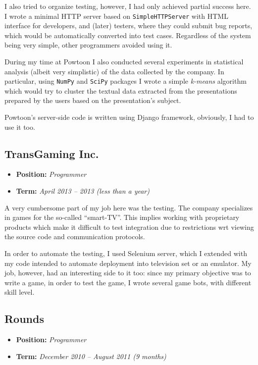 \documentclass[11pt]{article}
\begin{document}
I also tried to organize testing, however, I had only achieved partial success
here.  I wrote a minimal HTTP server based on \texttt{SimpleHTTPServer} with HTML
interface for developers, and (later) testers, where they could submit bug
reports, which would be automatically converted into test cases.  Regardless
of the system being very simple, other programmers avoided using it.

During my time at Powtoon I also conducted several experiments in statistical
analysis (albeit very simplistic) of the data collected by the company.
In particular, using \texttt{NumPy} and \texttt{SciPy} packages I wrote a simple \emph{k-means}
algorithm which would try to cluster the textual data extracted from the
presentations prepared by the users based on the presentation's subject.

Powtoon's server-side code is written using Django framework, obviously,
I had to use it too.

\subsection{TransGaming Inc.}
\label{sec:orgheadline4}
\begin{itemize}
\item \textbf{Position:} \emph{Programmer}
\item \textbf{Term:} \emph{April 2013 – 2013 (less than a year)}
\end{itemize}

A very cumbersome part of my job here was the testing.  The company
specializes in games for the so-called ``smart-TV''.  This implies working
with proprietary products which make it difficult to test integration due to
restrictions wrt viewing the source code and communication protocols.

In order to automate the testing, I used Selenium server, which I extended
with my code intended to automate deployment into television set or an
emulator.  My job, however, had an interesting side to it too: since my
primary objective was to write a game, in order to test the game, I wrote
several game bots, with different skill level.

\subsection{Rounds}
\label{sec:orgheadline5}
\begin{itemize}
\item \textbf{Position:} \emph{Programmer}
\item \textbf{Term:} \emph{December 2010 – August 2011 (9 months)}
\end{itemize}
\end{document}

